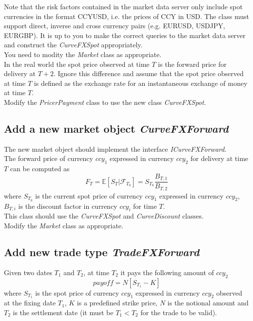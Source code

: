 \documentclass[10pt]{article}
\begin{document}
Note that the risk factors contained in the market data server only include spot currencies in the format CCYUSD, i.e. the prices of CCY in USD. The class must support direct, inverse and cross currency pairs (e.g. EURUSD, USDJPY, EURGBP). It is up to you to make the correct queries to the market data server and construct the \textit{CurveFXSpot} appropriately.\\

You need to modity the \textit{Market} class as appropriate.\\

In the real world the spot price observed at time $T$ is the forward price for delivery at $T+2$. Ignore this difference and assume that the spot price observed at time $T$ is defined as the exchange rate for an instantaneous exchange of money at time $T$.\\

Modify the \textit{PricerPayment} class to use the new class \textit{CurveFXSpot}.

\subsection{Add a new market object \textit{CurveFXForward}}
The new market object should implement the interface \textit{ICurveFXForward}.\\

The forward price of currency $ccy_1$ expressed in currency $ccy_2$ for delivery at time $T$ can be computed as
$$F_T=\mathbb{E}[S_T|\mathcal{F}_{T_0}]=S_{T_0} \frac{B_{T,1}}{B_{T,2}}$$
where $S_{T_0}$ is the current spot price of currency $ccy_1$ expressed in currency $ccy_2$, $B_{T,i}$ is the discount factor in currency $ccy_i$ for time $T$.\\

This class should use the \textit{CurveFXSpot} and \textit{CurveDiscount} classes.\\

Modify the \textit{Market} class as appropriate.

\subsection{Add new trade type \textit{TradeFXForward}}
Given two dates $T_1$ and $T_2$, at time $T_2$ it pays the following amount of $ccy_2$
$$
payoff=N[S_{T_1}-K]
$$
where $S_{T_1}$ is the spot price of currency $ccy_1$ expressed in currency $ccy_2$  observed at the fixing date $T_1$, $K$ is a predefined strike price, $N$ is the notional amount and $T_2$ is the settlement date (it must be $T_1<T_2$ for the trade to be valid).\\
\end{document}
